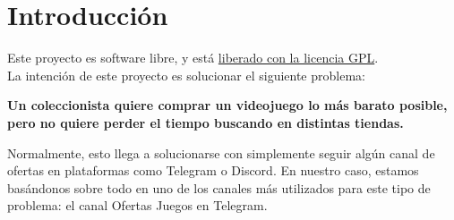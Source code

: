 \chapter{Introducción}

Este proyecto es software libre, y está \href{https://github.com/jero-dev/proyecto-tfg/LICENSE}{liberado con la licencia GPL}.\\

La intención de este proyecto es solucionar el siguiente problema:

\begin{center}
    \textbf{Un coleccionista quiere comprar un videojuego lo más barato posible, pero no quiere perder el tiempo buscando en distintas tiendas.}\\
\end{center}

Normalmente, esto llega a solucionarse con simplemente seguir algún canal de ofertas en plataformas como Telegram o Discord.
En nuestro caso, estamos basándonos sobre todo en uno de los canales más utilizados para este tipo de problema: el canal Ofertas Juegos en Telegram.\\

